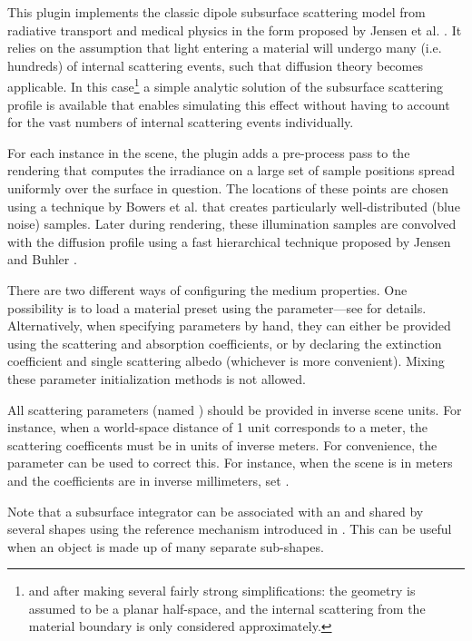 This plugin implements the classic dipole subsurface scattering model
from radiative transport and medical physics \cite{Eason1978Theory,
Farrell1992Diffusion} in the form proposed by Jensen et al.
\cite{Jensen2001Practical}. It relies on the assumption that light entering
a material will undergo many (i.e. hundreds) of internal scattering
events, such that diffusion theory becomes applicable. In this
case\footnote{and after making several fairly strong simplifications:
the geometry is assumed to be a planar half-space, and the internal
scattering from the material boundary is only considered approximately.}
a simple analytic solution of the subsurface scattering profile is available
that enables simulating this effect without having to account for the vast
numbers of internal scattering events individually.

For each  instance in the scene, the plugin adds a pre-process pass
to the rendering that computes the irradiance on a large set of sample positions
spread uniformly over the surface in question. The locations of these
points are chosen using a technique by Bowers et al. \cite{Bowers2010Parallel}
that creates particularly well-distributed (blue noise) samples. Later during
rendering, these  illumination samples are convolved with the diffusion profile
using a fast hierarchical technique proposed by Jensen and Buhler \cite{Jensen2005Rapid}.

There are two different ways of configuring the medium properties.
One possibility is to load a material preset
using the  parameter---see 
for details. Alternatively, when specifying parameters by hand, they
can either be provided using the scattering and absorption coefficients,
or by declaring the extinction coefficient and single scattering albedo
(whichever is more convenient). Mixing these parameter initialization
methods is not allowed.

All scattering parameters (named ) should
be provided in inverse scene units. For instance, when a world-space
distance of 1 unit corresponds to a meter, the scattering coefficents must
be in units of inverse meters. For convenience, the 
parameter can be used to correct this. For instance, when the scene is
in meters and the coefficients are in inverse millimeters, set
.

Note that a subsurface integrator can be associated with an 
and shared by several shapes using the reference mechanism introduced in
. This can be useful when an object is made up of many
separate sub-shapes.


